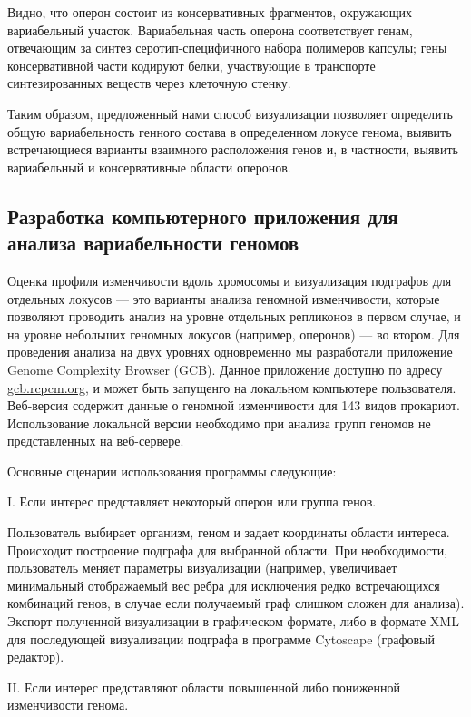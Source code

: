 Видно, что оперон состоит из консервативных фрагментов, окружающих вариабельный участок. Вариабельная часть оперона соответствует генам, отвечающим за синтез серотип-специфичного набора полимеров капсулы; гены консервативной части кодируют белки, участвующие в транспорте синтезированных веществ через клеточную стенку.

Таким образом, предложенный нами способ визуализации позволяет определить общую вариабельность генного состава в определенном локусе генома, выявить встречающиеся варианты взаимного расположения генов и, в частности, выявить вариабельный и консервативные области оперонов.

\subsection*{Разработка компьютерного приложения для анализа вариабельности геномов} \label{chaptGCB}

Оценка профиля изменчивости вдоль хромосомы и визуализация подграфов для отдельных локусов --- это варианты анализа геномной изменчивости, которые позволяют проводить анализ на уровне отдельных репликонов в первом случае, и на уровне небольших геномных локусов (например, оперонов) --- во втором. Для проведения анализа на двух уровнях одновременно мы разработали приложение Genome Complexity Browser (GCB). Данное приложение доступно по адресу \url{gcb.rcpcm.org}, и может быть запущенго на локальном компьютере пользователя. Веб-версия содержит данные о геномной изменчивости для 143 видов прокариот. Использование локальной версии необходимо при анализа групп геномов не представленных на веб-сервере.

Основные сценарии использования программы следующие:

I. Если интерес представляет некоторый оперон или группа генов.

Пользователь выбирает организм, геном и задает координаты области интереса. Происходит построение подграфа для выбранной области. При необходимости, пользователь меняет параметры визуализации (например, увеличивает минимальный отображаемый вес ребра для исключения редко встречающихся комбинаций генов, в случае если получаемый граф слишком сложен для анализа). Экспорт полученной визуализации в графическом формате, либо в формате XML для последующей визуализации подграфа в программе Cytoscape (графовый редактор). 

II. Если интерес представляют области повышенной либо пониженной изменчивости генома.

